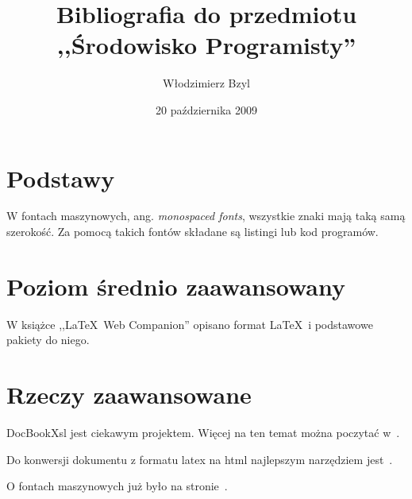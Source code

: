 \documentclass[12pt]{article}
\title{Bibliografia do przedmiotu\\,,Środowisko Programisty''}
\author{Włodzimierz Bzyl}
\date{20 października 2009}
\begin{document}
\maketitle
\tableofcontents

\section{Podstawy}\label{sec:basics}

W fontach maszynowych, ang. \emph{monospaced fonts},
wszystkie znaki mają taką samą  szerokość. Za pomocą takich 
fontów składane są listingi lub kod programów.

\section{Poziom średnio zaawansowany}\label{sec:intermediate}

W książce ,,\LaTeX\ Web Companion'' opisano
format \LaTeX\ i podstawowe pakiety do niego.

\section{Rzeczy zaawansowane}\label{sec:advanced}

DocBookXsl jest ciekawym projektem. Więcej na ten temat
można poczytać w~\cite{wiki.docbookxsl}.

Do konwersji dokumentu z formatu latex na html najlepszym narzędziem
jest~\cite[uwaga, system szuka nowego opiekuna]{Gurari.TeX4ht}.

O fontach maszynowych już było na stronie~\pageref{sec:basics}.


\end{document}
